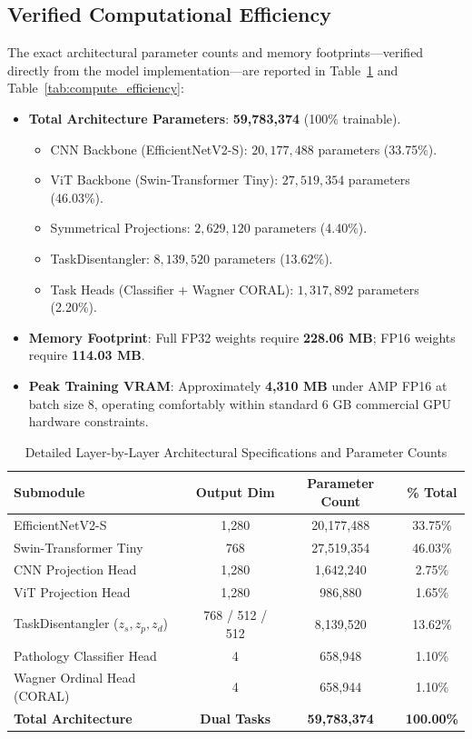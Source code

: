 \documentclass[journal]{IEEEtran}
\begin{document}
\subsection{Verified Computational Efficiency}
The exact architectural parameter counts and memory footprints---verified directly from the model implementation---are reported in Table~\ref{tab:param_breakdown} and Table~\ref{tab:compute_efficiency}:
\begin{itemize}
    \item \textbf{Total Architecture Parameters}: \textbf{59,783,374} (100\% trainable).
    \begin{itemize}
        \item CNN Backbone (EfficientNetV2-S): $20,177,488$ parameters (33.75\%).
        \item ViT Backbone (Swin-Transformer Tiny): $27,519,354$ parameters (46.03\%).
        \item Symmetrical Projections: $2,629,120$ parameters (4.40\%).
        \item TaskDisentangler: $8,139,520$ parameters (13.62\%).
        \item Task Heads (Classifier + Wagner CORAL): $1,317,892$ parameters (2.20\%).
    \end{itemize}
    \item \textbf{Memory Footprint}: Full FP32 weights require \textbf{228.06 MB}; FP16 weights require \textbf{114.03 MB}.
    \item \textbf{Peak Training VRAM}: Approximately \textbf{4,310 MB} under AMP FP16 at batch size 8, operating comfortably within standard 6 GB commercial GPU hardware constraints.
\end{itemize}

\begin{table}[h]
\centering
\caption{Detailed Layer-by-Layer Architectural Specifications and Parameter Counts}
\label{tab:param_breakdown}
\begin{tabular}{lccc}
\toprule
\textbf{Submodule} & \textbf{Output Dim} & \textbf{Parameter Count} & \textbf{\% Total} \\
\midrule
EfficientNetV2-S & 1,280 & 20,177,488 & 33.75\% \\
Swin-Transformer Tiny & 768 & 27,519,354 & 46.03\% \\
CNN Projection Head & 1,280 & 1,642,240 & 2.75\% \\
ViT Projection Head & 1,280 & 986,880 & 1.65\% \\
TaskDisentangler ($z_s, z_p, z_d$) & 768 / 512 / 512 & 8,139,520 & 13.62\% \\
Pathology Classifier Head & 4 & 658,948 & 1.10\% \\
Wagner Ordinal Head (CORAL) & 4 & 658,944 & 1.10\% \\
\midrule
\textbf{Total Architecture} & \textbf{Dual Tasks} & \textbf{59,783,374} & \textbf{100.00\%} \\
\bottomrule
\end{tabular}
\end{table}
\end{document}
